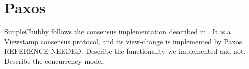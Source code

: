 \section{Paxos}

SimpleChubby follows the consensus implementation described in \cite{mazieres2007paxos}.
It is a Viewstamp consensus protocol, and its view-change is implemented by Paxos.
REFERENCE NEEDED.
Describe the functionality we implemented and not.
Describe the concurrency model.
